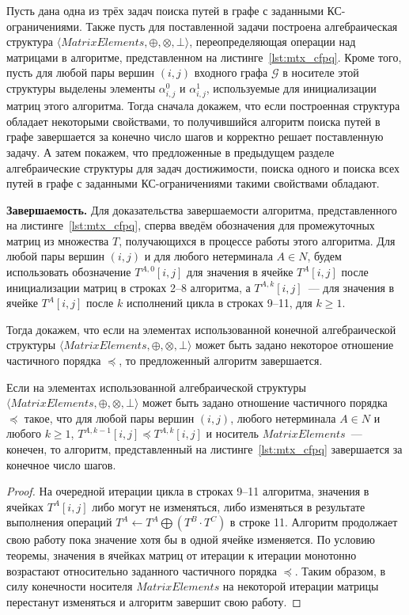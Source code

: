 Пусть дана одна из трёх задач поиска путей в графе с заданными КС-ограничениями. Также пусть для поставленной задачи построена алгебраическая структура $\langle \textit{MatrixElements}, \oplus, \otimes, \bot \rangle$, переопределяющая операции над матрицами в алгоритме, представленном на листинге~\ref{lst:mtx_cfpq}. Кроме того, пусть для любой пары вершин $(i, j)$ входного графа $\mathcal{G}$ в носителе этой структуры выделены элементы $\alpha^0_{i, j}$ и $\alpha^1_{i, j}$, используемые для инициализации матриц этого алгоритма. Тогда сначала докажем, что если построенная структура обладает некоторыми свойствами, то получившийся алгоритм поиска путей в графе завершается за конечно число шагов и корректно решает поставленную задачу. А затем покажем, что предложенные в предыдущем разделе алгебраические структуры для задач достижимости, поиска одного и поиска всех путей в графе с заданными КС-ограничениями такими свойствами обладают.

\textbf{Завершаемость.} Для доказательства завершаемости алгоритма, представленного на листинге~\ref{lst:mtx_cfpq}, сперва введём обозначения для промежуточных матриц из множества $T$, получающихся в процессе работы этого алгоритма. Для любой пары вершин $(i, j)$ и для любого нетерминала $A \in N$, будем использовать обозначение $T^{A, 0}[i, j]$ для значения в ячейке $T^{A}[i, j]$ после инициализации матриц в строках 2--8 алгоритма, а $T^{A, k}[i, j]$~--- для значения в ячейке $T^{A}[i, j]$ после $k$ исполнений цикла в строках 9--11, для $k \geq 1$.

Тогда докажем, что если на элементах использованной конечной алгебраической структуры $\langle \textit{MatrixElements}, \oplus, \otimes, \bot \rangle$ может быть задано некоторое отношение частичного порядка $\preceq$, то предложенный алгоритм завершается.

\begin{theorem}\label{thm:finite_mtx}
	 Если на элементах использованной алгебраической структуры $\langle \textit{MatrixElements}, \oplus, \otimes, \bot \rangle$ может быть задано отношение частичного порядка $\preceq$ такое, что для любой пары вершин $(i, j)$, любого нетерминала $A \in N$ и любого $k \geq 1$, $T^{A, k - 1}[i, j] \preceq T^{A, k}[i, j]$ и носитель $\textit{MatrixElements}$~--- конечен, то алгоритм, представленный на листинге~\ref{lst:mtx_cfpq} завершается за конечное число шагов.
\end{theorem}
\begin{proof}
На очередной итерации цикла в строках 9--11 алгоритма, значения в ячейках $T^A[i, j]$ либо могут не изменяться, либо изменяться в результате выполнения операций $T^{A} \gets T^{A} \bigoplus (T^{B} \cdot T^{C})$ в строке 11. Алгоритм продолжает свою работу пока значение хотя бы в одной ячейке изменяется. По условию теоремы, значения в ячейках матриц от итерации к итерации монотонно возрастают относительно заданного частичного порядка $\preceq$. Таким образом, в силу конечности носителя $\textit{MatrixElements}$ на некоторой итерации матрицы перестанут изменяться и алгоритм завершит свою работу.
\end{proof}

